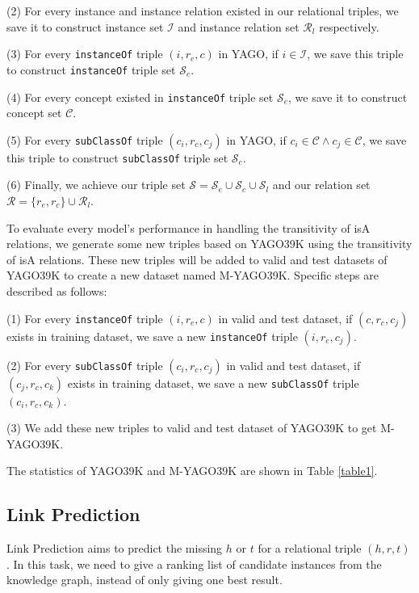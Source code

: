 \documentclass[11pt,a4paper]{article}
\begin{document}
  (2) For every instance and instance relation existed in our relational triples, we save it to construct 
  instance set $\mathcal{I}$ and instance relation set $\mathcal{R}_l$ respectively.
  
  (3) For every \texttt{instanceOf} triple $(i, r_e, c)$ in YAGO, if $i \in \mathcal{I}$, we save this triple 
  to construct \texttt{instanceOf} triple set $\mathcal{S}_e$.
  
  (4) For every concept existed in \texttt{instanceOf} triple set $\mathcal{S}_e$, we save it to construct 
  concept set $\mathcal{C}$. 
  
  (5) For every \texttt{subClassOf} triple $(c_i, r_c, c_j)$ in YAGO, if $c_i \in \mathcal{C} \land c_j \in \mathcal{C}$, 
  we save this triple to construct \texttt{subClassOf} triple set $\mathcal{S}_c$.
  
  (6) Finally, we achieve our triple set $\mathcal{S} = \mathcal{S}_e \cup \mathcal{S}_c \cup \mathcal{S}_l$
  and our relation set $\mathcal{R} = \{r_e, r_c\} \cup \mathcal{R}_l$.
  
  To evaluate every model's performance in handling the transitivity of isA relations, we generate some new triples
  based on YAGO39K using the transitivity of isA relations. These new triples will be added to
  valid and test datasets of YAGO39K to create a new dataset named M-YAGO39K. Specific steps are described as follows:
  
  (1) For every \texttt{instanceOf} triple $(i, r_e, c)$ in valid and test dataset, if $(c, r_c, c_j)$ exists in training dataset, 
  we save a new \texttt{instanceOf} triple $(i, r_e, c_j)$.
  
  (2) For every \texttt{subClassOf} triple $(c_i, r_c, c_j)$ in valid and test dataset, if $(c_j, r_c, c_k)$ exists in training dataset, 
  we save a new \texttt{subClassOf} triple $(c_i, r_c, c_k)$.
  
  (3) We add these new triples to valid and test dataset of YAGO39K to get M-YAGO39K.
  
  The statistics of YAGO39K and M-YAGO39K are shown in Table \ref{table1}.
  
  
  \subsection{Link Prediction}
  
  Link Prediction aims to predict the missing $h$ or $t$ for a relational triple $(h, r, t)$. In this task, we need to
  give a ranking list of candidate instances from the knowledge graph, instead of only giving one best result.
  
\end{document}
